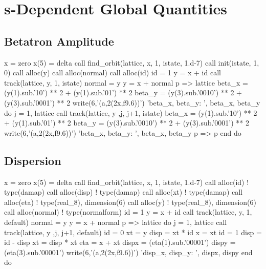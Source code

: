 \section{s-Dependent Global Quantities}

\subsection{Betatron Amplitude}

\makeusother
\begin{ptccode}
x = zero
x(5) = delta
call find_orbit(lattice, x, 1, istate, 1.d-7)
call init(istate, 1, 0)
call alloc(y)
call alloc(normal)
call alloc(id)
id = 1
y = x + id
call track(lattice, y, 1, istate)
normal = y
y = x + normal%
p => lattice%
beta_x = (y(1).sub.'10') ** 2   + (y(1).sub.'01') ** 2
beta_y = (y(3).sub.'0010') ** 2 + (y(3).sub.'0001') ** 2
write(6,'(a,2(2x,f9.6))') 'beta_x, beta_y: ', beta_x, beta_y
do j = 1, lattice%
  call track(lattice, y ,j, j+1, istate)
  beta_x = (y(1).sub.'10') ** 2   + (y(1).sub.'01') ** 2
  beta_y = (y(3).sub.'0010') ** 2 + (y(3).sub.'0001') ** 2
  write(6,'(a,2(2x,f9.6))') 'beta_x, beta_y: ', beta_x, beta_y
  p => p%
end do
\end{ptccode}
\makeussubscript





\subsection{Dispersion}

\makeusother
\begin{ptccode}
x = zero
x(5) = delta
call find_orbit(lattice, x, 1, istate, 1.d-7)
call alloc(id)      ! type(damap)
call alloc(disp)    ! type(damap)
call alloc(xt)      ! type(damap)
call alloc(eta)     ! type(real_8), dimension(6)
call alloc(y)       ! type(real_8), dimension(6)
call alloc(normal)  ! type(normalform)
id = 1
y = x + id
call track(lattice, y, 1, default)
normal = y
y = x + normal%
p => lattice%
do j = 1, lattice%
  call track(lattice, y ,j, j+1, default)
  id = 0
  xt = y
  disp = xt * id
  x = xt
  id = 1
  disp = id - disp
  xt = disp * xt
  eta = x + xt
  dispx = (eta(1).sub.'00001')
  dispy = (eta(3).sub.'00001')
  write(6,'(a,2(2x,f9.6))') 'disp_x, disp_y: ', dispx, dispy
end do
\end{ptccode}
\makeussubscript



